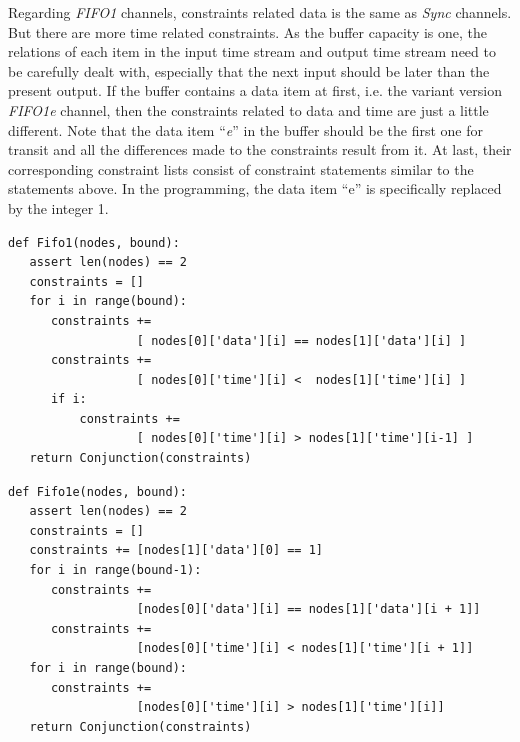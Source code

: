 \documentclass[preprint,3p]{elsarticle}
\begin{document}
Regarding \emph{FIFO1} channels, constraints related data is the same as \emph{Sync} channels. But there are more time related constraints. As the buffer capacity is one, the relations of each item in the input time stream and output time stream need to be carefully dealt with, especially that the next input should be later than the present output. If the buffer contains a data item at first, i.e. the variant version \emph{FIFO1e} channel, then the constraints related to data and time are just a little different. Note that the data item ``\emph{e}'' in the buffer should be the first one for transit and all the differences made to the constraints result from it. At last, their corresponding constraint lists consist of constraint statements similar to the statements above. In the programming, the data item ``e'' is specifically replaced by the integer 1.
\begin{lstlisting}[frame=single]
def Fifo1(nodes, bound):
   assert len(nodes) == 2
   constraints = []
   for i in range(bound):
      constraints +=
                  [ nodes[0]['data'][i] == nodes[1]['data'][i] ]
      constraints +=
                  [ nodes[0]['time'][i] <  nodes[1]['time'][i] ]
      if i:
          constraints +=
                  [ nodes[0]['time'][i] > nodes[1]['time'][i-1] ]
   return Conjunction(constraints)
\end{lstlisting}
\begin{lstlisting}[frame=single]
def Fifo1e(nodes, bound):
   assert len(nodes) == 2
   constraints = []
   constraints += [nodes[1]['data'][0] == 1]
   for i in range(bound-1):
      constraints +=
                  [nodes[0]['data'][i] == nodes[1]['data'][i + 1]]
      constraints +=
                  [nodes[0]['time'][i] < nodes[1]['time'][i + 1]]
   for i in range(bound):
      constraints +=
                  [nodes[0]['time'][i] > nodes[1]['time'][i]]
   return Conjunction(constraints)
\end{lstlisting}
\end{document}
